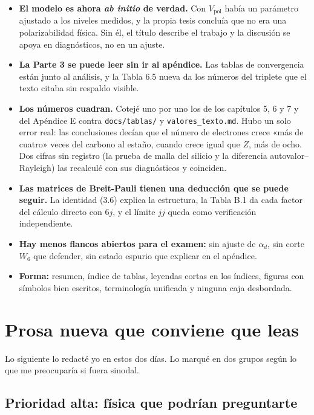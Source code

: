\documentclass[11pt,a4paper]{article}
\newcommand{\arch}[1]{\texttt{\small #1}}
\begin{document}
\begin{itemize}
\item \textbf{El modelo es ahora \emph{ab initio} de verdad.} Con $V_{\text{pol}}$ había un parámetro
ajustado a los niveles medidos, y la propia tesis concluía que no era una polarizabilidad física. Sin
él, el título describe el trabajo y la discusión se apoya en diagnósticos, no en un ajuste.
\item \textbf{La Parte 3 se puede leer sin ir al apéndice.} Las tablas de convergencia están junto al
análisis, y la Tabla 6.5 nueva da los números del triplete que el texto citaba sin respaldo visible.
\item \textbf{Los números cuadran.} Cotejé uno por uno los de los capítulos 5, 6 y 7 y del
Apéndice E contra \arch{docs/tablas/} y \arch{valores\_texto.md}. Hubo un solo error real: las
conclusiones decían que el número de electrones crece «más de cuatro» veces del carbono al estaño,
cuando crece igual que $Z$, más de ocho. Dos cifras sin registro (la prueba de malla del silicio y la
diferencia autovalor--Rayleigh) las recalculé con sus diagnósticos y coinciden.
\item \textbf{Las matrices de Breit-Pauli tienen una deducción que se puede seguir.} La identidad
(3.6) explica la estructura, la Tabla B.1 da cada factor del cálculo directo con $6j$, y el límite
$jj$ queda como verificación independiente.
\item \textbf{Hay menos flancos abiertos para el examen:} sin ajuste de $\alpha_d$, sin corte $W_6$
que defender, sin estado espurio que explicar en el apéndice.
\item \textbf{Forma:} resumen, índice de tablas, leyendas cortas en los índices, figuras con
símbolos bien escritos, terminología unificada y ninguna caja desbordada.
\end{itemize}

\section{Prosa nueva que conviene que leas}
\label{sec:prosa}

Lo siguiente lo redacté yo en estos dos días. Lo marqué en dos grupos según lo que me preocuparía
si fuera sinodal.

\subsection*{Prioridad alta: física que podrían preguntarte}
\end{document}
